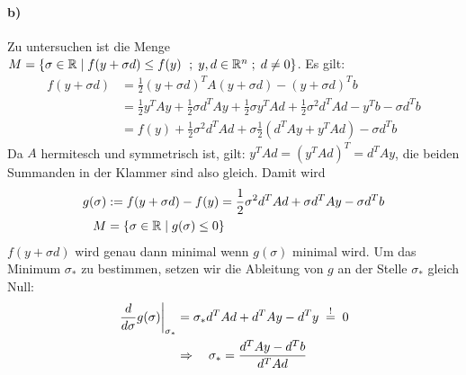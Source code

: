 \paragraph*{b)}
Zu untersuchen ist die Menge $M = \{\sigma \in \mathbb R \mid f(y + \sigma d) \le f(y)\ \;;\; y, d \in \mathbb R^n \;;\; d \ne 0 \}$. Es gilt:
\begin{align*}
  f(y + \sigma d) & = \frac{1}{2} (y + \sigma d)^T A (y + \sigma d) - (y + \sigma d)^T b\\
  & =   \frac{1}{2}y^TA y  + \frac{1}{2}\sigma d^T A y + \frac{1}{2}\sigma y^T A d
      + \frac{1}{2} \sigma^2 d^T A d - y^T b - \sigma d^T b\\
  & = f(y) + \frac{1}{2} \sigma^2 d^T A d + \sigma \frac{1}{2} (d^T A y
      + y^T A d) - \sigma d^T b
\end{align*}
Da $A$ hermitesch und symmetrisch ist, gilt: $y^T A d = (y^T A d )^T = d^T A y$,
die beiden Summanden in der Klammer sind also gleich. Damit wird
\begin{align*}
 g(\sigma) & := f(y + \sigma d) - f(y) = \frac{1}{2} \sigma^2 d^T A d  + \sigma d^T A y -  \sigma d^T b\\
 M & = \{\sigma \in \mathbb R \mid  g(\sigma) \le 0\}
\end{align*}
$f(y + \sigma d)$ wird genau dann minimal wenn $g(\sigma)$ minimal wird.
Um das Minimum $\sigma_*$ zu bestimmen, setzen wir die Ableitung von $g$
an der Stelle $\sigma_*$ gleich Null:
\begin{align*}
  \left. \frac{d}{d \sigma} g(\sigma) \right|_{\sigma_*}
  &= \sigma_* d^T A d + d^T A y - d^T y\;\overset{!}{=} \; 0 \\
  & \Rightarrow \quad \sigma_* = \frac{d^T A y  - d^T b} {d^T A d}
\end{align*}



